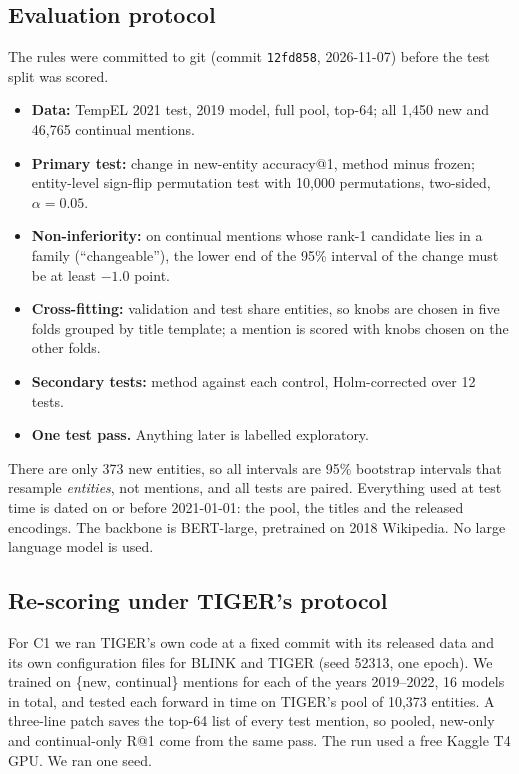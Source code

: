 \documentclass[conference]{IEEEtran}
\begin{document}
\subsection{Evaluation protocol}

The rules were committed to git (commit \texttt{12fd858}, 2026-11-07) before the test split was scored.
\begin{itemize}
\item \textbf{Data:} TempEL 2021 test, 2019 model, full pool, top-64; all 1,450 new and 46,765
continual mentions.
\item \textbf{Primary test:} change in new-entity accuracy@1, method minus frozen; entity-level
sign-flip permutation test with 10,000 permutations, two-sided, $\alpha = 0.05$.
\item \textbf{Non-inferiority:} on continual mentions whose rank-1 candidate lies in a family
(``changeable''), the lower end of the 95\% interval of the change must be at least $-1.0$ point.
\item \textbf{Cross-fitting:} validation and test share entities, so knobs are chosen in five folds
grouped by title template; a mention is scored with knobs chosen on the other folds.
\item \textbf{Secondary tests:} method against each control, Holm-corrected \cite{holm} over 12 tests.
\item \textbf{One test pass.} Anything later is labelled exploratory.
\end{itemize}

There are only 373 new entities, so all intervals are 95\% bootstrap intervals that resample
\emph{entities}, not mentions, and all tests are paired. Everything used at test time is dated on or
before 2021-01-01: the pool, the titles and the released encodings. The backbone is BERT-large,
pretrained on 2018 Wikipedia. No large language model is used.

\subsection{Re-scoring under TIGER's protocol}

For C1 we ran TIGER's own code at a fixed commit \cite{tigercode} with its released data
\cite{tigerdata} and its own configuration files for BLINK and TIGER (seed 52313, one epoch). We
trained on \{new, continual\} mentions for each of the years 2019--2022, 16 models in total, and
tested each forward in time on TIGER's pool of 10,373 entities. A three-line patch saves the top-64
list of every test mention, so pooled, new-only and continual-only R@1 come from the same pass. The
run used a free Kaggle T4 GPU. We ran one seed.
\end{document}
